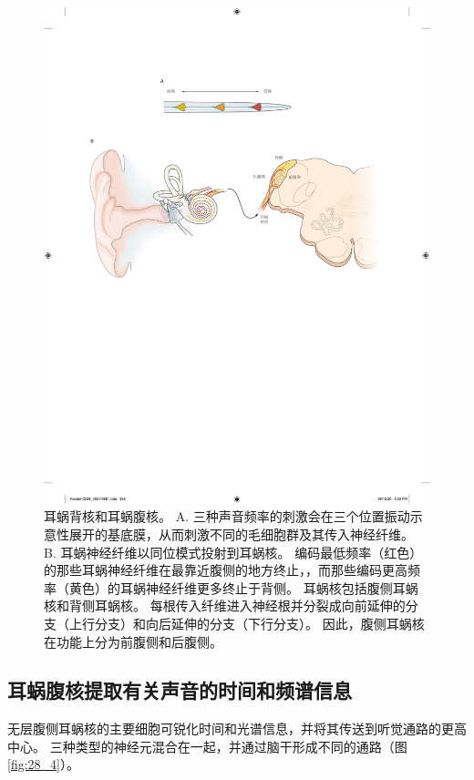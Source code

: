 \begin{figure}[htbp]
	\centering
	\includegraphics[width=0.95\linewidth]{chap28/fig_28_3}
	\caption{耳蜗背核和耳蜗腹核。 
		A. 三种声音频率的刺激会在三个位置振动示意性展开的基底膜，从而刺激不同的毛细胞群及其传入神经纤维。
		B. 耳蜗神经纤维以同位模式投射到耳蜗核。
		编码最低频率（红色）的那些耳蜗神经纤维在最靠近腹侧的地方终止，，而那些编码更高频率（黄色）的耳蜗神经纤维更多终止于背侧。
		耳蜗核包括腹侧耳蜗核和背侧耳蜗核。
		每根传入纤维进入神经根并分裂成向前延伸的分支（上行分支）和向后延伸的分支（下行分支）。
		因此，腹侧耳蜗核在功能上分为前腹侧和后腹侧。}
	\label{fig:28_3}
\end{figure}



\subsection{耳蜗腹核提取有关声音的时间和频谱信息}

无层腹侧耳蜗核的主要细胞可锐化时间和光谱信息，并将其传送到听觉通路的更高中心。 
三种类型的神经元混合在一起，并通过脑干形成不同的通路（图 \ref{fig:28_4}）。


